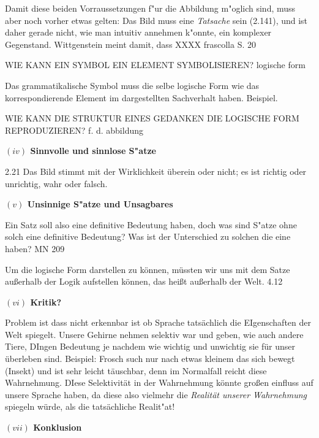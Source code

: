 \documentclass[a4paper, emulatestandardclasses, 12pt]{scrartcl}
\begin{document}
\begin{onehalfspace}
Damit diese beiden Vorraussetzungen f"ur die Abbildung m"oglich sind, muss aber noch vorher etwas gelten: Das Bild muss eine \emph{Tatsache} sein (2.141), und ist daher gerade nicht, wie man intuitiv annehmen k"onnte, ein komplexer Gegenstand. Wittgenstein meint damit, dass XXXX frascolla S. 20

WIE KANN EIN SYMBOL EIN ELEMENT SYMBOLISIEREN? logische form

Das grammatikalische Symbol muss die selbe logische Form wie das korrespondierende Element im dargestellten Sachverhalt haben. Beispiel.

WIE KANN DIE STRUKTUR EINES GEDANKEN DIE LOGISCHE FORM REPRODUZIEREN? f. d. abbildung






\vspace{5mm}
\noindent\textbf{$(iv)$ Sinnvolle und sinnlose S"atze}	

2.21
Das Bild stimmt mit der Wirklichkeit überein oder nicht; es ist richtig oder unrichtig, wahr oder falsch.

\vspace{5mm}
\noindent\textbf{$(v)$ Unsinnige S"atze und Unsagbares}	

Ein Satz soll also eine definitive Bedeutung haben, doch was sind S"atze ohne solch eine definitive Bedeutung? Was ist der Unterschied zu solchen die eine haben? MN 209

Um die logische Form darstellen zu können, müssten wir uns mit dem Satze außerhalb der Logik aufstellen können, das heißt außerhalb der Welt. 4.12

\vspace{5mm}
\noindent\textbf{$(vi)$ Kritik?}	

Problem ist dass nicht erkennbar ist ob Sprache tatsächlich die EIgenschaften der Welt spiegelt. Unsere Gehirne nehmen selektiv war und geben, wie auch andere Tiere, DIngen Bedeutung je nachdem wie wichtig und unwichtig sie für unser überleben sind. Beispiel: Frosch such nur nach etwas kleinem das sich bewegt (Insekt) und ist sehr leicht täuschbar, denn im Normalfall reicht diese Wahrnehmung. DIese Selektivität in der Wahrnehmung könnte großen einfluss auf unsere Sprache haben, da diese also vielmehr die \emph{Realität unserer Wahrnehmung} spiegeln würde, als die tatsächliche Realit"at!

\vspace{5mm}
\noindent\textbf{$(vii)$ Konklusion}

\end{onehalfspace}
\nocite{*}

\end{document}
